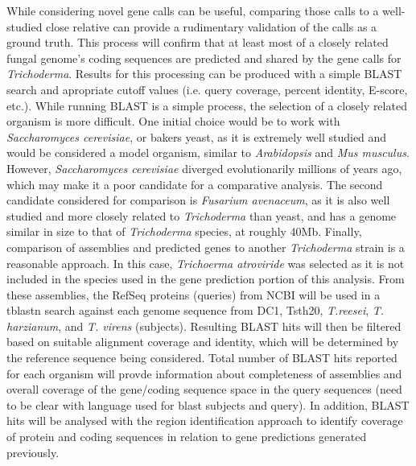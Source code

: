 While considering novel gene calls can be useful, comparing those
calls to a well-studied close relative can provide a rudimentary
validation of the calls as a ground truth. This process will confirm
that at least most of a closely related fungal genome's coding
sequences are predicted and shared by the gene calls for
\textit{Trichoderma}. Results for this processing can be produced with
a simple BLAST search and apropriate cutoff values (i.e. query
coverage, percent identity, E-score, etc.). While running BLAST is a
simple process, the selection of a closely related organism is more
difficult. One initial choice would be to work with
\textit{Saccharomyces cerevisiae}, or bakers yeast, as it is extremely
well studied and would be considered a model organism, similar to
\textit{Arabidopsis} and \textit{Mus musculus}. However,
\textit{Saccharomyces cerevisiae} diverged evolutionarily millions of
years ago, which may make it a poor candidate for a comparative
analysis. The second candidate considered for comparison is
\textit{Fusarium avenaceum}, as it is also well studied and more
closely related to \textit{Trichoderma} than yeast, and has a genome
similar in size to that of \textit{Trichoderma} species, at roughly
40Mb. Finally, comparison of assemblies and predicted genes to another
\textit{Trichoderma} strain is a reasonable approach. In this case,
\textit{Trichoerma atroviride} was selected as it is not included in
the species used in the gene prediction portion of this analysis. From
these assemblies, the RefSeq proteins (queries) from NCBI will be used
in a tblastn search against each genome sequence from DC1, Tsth20,
\textit{T.reesei}, \textit{T. harzianum}, and \textit{T. virens}
(subjects). Resulting BLAST hits will then be filtered based on
suitable alignment coverage and identity, which will be determined by
the reference sequence being considered. Total number of BLAST hits
reported for each organism will provde information about completeness
of assemblies and overall coverage of the gene/coding sequence space
in the query sequences (need to be clear with language used for blast
subjects and query). In addition, BLAST hits will be analysed with the
region identification approach to identify coverage of protein and coding
sequences in relation to gene predictions generated previously.

